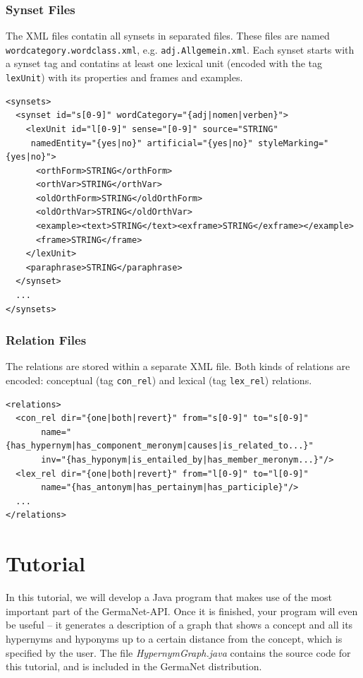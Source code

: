 \documentclass[12pt,a4paper,english,utf8]{report}
\begin{document}
\subsection{Synset Files}
The XML files contatin all synsets in separated files. These files are named \texttt{wordcategory.wordclass.xml}, e.g. \texttt{adj.Allgemein.xml}. Each synset starts with a synset tag and contatins at least one lexical unit (encoded with the tag \texttt{lexUnit}) with its properties and frames and examples.

\begin{lstlisting}
<synsets>
  <synset id="s[0-9]" wordCategory="{adj|nomen|verben}">
    <lexUnit id="l[0-9]" sense="[0-9]" source="STRING"
     namedEntity="{yes|no}" artificial="{yes|no}" styleMarking="{yes|no}">
      <orthForm>STRING</orthForm>
      <orthVar>STRING</orthVar>
      <oldOrthForm>STRING</oldOrthForm>
      <oldOrthVar>STRING</oldOrthVar>
      <example><text>STRING</text><exframe>STRING</exframe></example>
      <frame>STRING</frame>
    </lexUnit>
    <paraphrase>STRING</paraphrase>
  </synset>
  ...
</synsets>
\end{lstlisting}



\subsection{Relation Files}
The relations are stored within a separate XML file. Both kinds of relations are encoded: conceptual (tag \texttt{con\_rel}) and lexical (tag \texttt{lex\_rel}) relations.

\begin{lstlisting}
<relations>
  <con_rel dir="{one|both|revert}" from="s[0-9]" to="s[0-9]"
       name="{has_hypernym|has_component_meronym|causes|is_related_to...}"
       inv="{has_hyponym|is_entailed_by|has_member_meronym...}"/>
  <lex_rel dir="{one|both|revert}" from="l[0-9]" to="l[0-9]"
       name="{has_antonym|has_pertainym|has_participle}"/>
  ...
</relations>
\end{lstlisting}





\chapter{Tutorial}
In this tutorial, we will develop a Java program that makes use of the most important part of the GermaNet-API. Once it is finished, your program will even be useful – it generates a description of a graph that shows a concept and all its hypernyms and hyponyms up to a certain distance from the concept, which is specified by the user. The file \emph{HypernymGraph.java} contains the source code for this tutorial, and is included in the GermaNet distribution.
\end{document}
